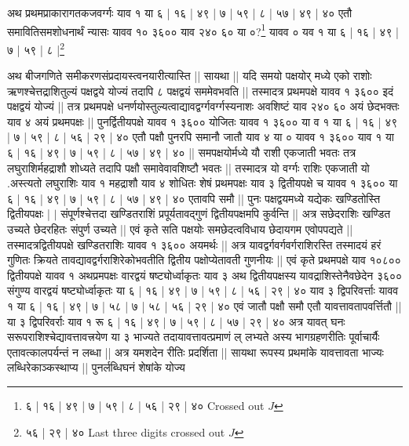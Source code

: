 \documentclass[12pt]{article}
\begin{document}
{\s अथ प्रथमप्राकारागतकजवर्ग्गः याव १ या ६ | १६ | ४९ | ७ | ५९ | ८ | ५७ | ४९ | ४०
एतौ समावितिसमशोधनार्थं न्यासः यावव १० ३६०० याव २४० ६०
या ०?\footnote{{\s ६ | १६ | ४९ | ७ | ५९ | ८ | ५६ | २९ | ४० } Crossed out $J$}
यावव ० यव १ या
६ | १६ | ४९ | ७ | ५९ | ८ |\footnote{ {\s ५६ | २९ | ४०}  Last three digits crossed out $J$}


अथ बीजगणिते समीकरणसंप्रदायस्त्वनयारीत्यास्ति ||
सायथा ||
यदि समयो पक्षयोर् मध्ये एको
राशोः ऋणश्चेत्तद्राशितुल्यं पक्षद्वये योज्यं तदापि ८ पक्षद्वयं सममेवभवति ||
तस्मादत्र प्रथमपक्षे यावव १ ३६०० इदं पक्षद्वयं योज्यं ||
तत्र प्रथमपक्षे
धनर्णयोस्तुल्यत्वाद्यावद्वर्ग्गवर्ग्गस्यनाशः अवशिष्टं याव २४० ६० अयं छेदभक्तः याव ४ अयं
प्रथमपक्षः ||
पुनर्द्वितीयपक्षे यावव १ ३६०० योजितः यावव १ ३६०० या व १ या ६ | १६ | ४९ | ७ | ५९ | ८ | ५६ | २९ |
४०
एतौ पक्षौ पुनरपि समानौ जातौ याव ४ या ० यावव १ ३६०० याव १ या ६ | १६ | ४९ | ७ | ५९ | ८ | ५७ | ४९ | ४० ||
समपक्षयोर्मध्ये यौ राशी एकजाती भवतः तत्र लघुराशिर्महद्राशौ शोध्यते तदापि पक्षौ
समावेवावशिष्टौ भवतः || तस्मादत्र यो वर्ग्गः राशिः एकजाती यो .अस्त्यतो लघुराशिः याव १ महद्राशौ
याव ४ शोधितः शेषं प्रथमपक्षः याव ३ द्वितीयपक्षे च यावव १ ३६०० या ६ | १६ | ४९ | ७ | ५९ | ८ | ५७ | ४९ | ४०
एतावपि समौ || पुनः पक्षद्वयमध्ये यद्येकः खण्डितोस्ति द्वितीयपक्षः | $|$
संपूर्णश्चेत्तदा खण्डितराशिं प्रपूर्यतावद्गुणं द्वितीयपक्षमपि कुर्वन्ति || अत्र सछेदराशिः खण्डित
उच्यते छेदरहितः संपुर्ण उच्यते || एवं कृते सति पक्षयोः समछेदत्वविधाय छेदायगम
एवोपपद्यते || तस्मादत्रद्वितीयपक्षे खण्डितराशिः यावव १ ३६०० अयमर्थः || अत्र
यावद्वर्गवर्गवर्गराशिरस्ति तस्मादयं हरं गुणितः क्रियते तावद्यावद्वर्गराशिरेकोभवतीति द्वितीय
पक्षोप्येतावती गुणनीयः || एवं कृते प्रथमपक्षे याव १०८०० द्वितीयपक्षे यावव १ अथप्रमपक्षः
वारद्वयं षष्ट्योर्ध्वाकृतः याव ३ अथ द्वितीयपक्षस्य यावद्राशिस्तेनैवछेदेन ३६०० संगुण्य
वारद्वयं षष्ट्योर्ध्वाकृतः या ६ | १६ | ४९ | ७ | ५९ | ८ | ५६ | २९ | ४० याव ३ द्विपरिवर्त्ताः यावव १ या ६ | १६ | ४९ | ७ |
५८ | ७ | ५८ | ५६ | २९ | ४० एवं जातौ पक्षौ समौ एतौ यावत्तावतापवर्त्तितौ || या ३ द्विपरिवर्राः याव १ रू ६ | १६ | ४९ | ७ |
५९ | ८ | ५७ | २९ | ४० अत्र यावत् घनः सरूपराशिश्चेद्यावत्तावत्त्रयेण या ३ भाज्यते तदायावत्तावत्प्रमाणं ल्
लभ्यते अस्य भागग्रहणरीतिः पूर्वाचार्यैः एतावत्कालपर्यन्तं न लब्धा || अत्र यमशदेन रीतिः प्रदर्शिता ||
सायथा रूपस्य प्रथमांके यावत्तावता भाज्यः लब्धिरेकाञ्कस्थाप्य || पुनर्लब्धिघनं शेषांके योज्य
}
\end{document}
